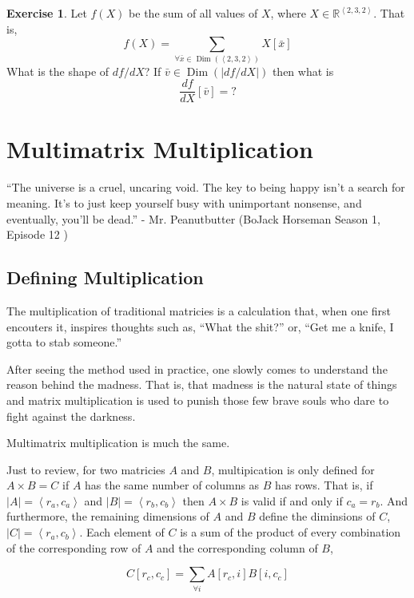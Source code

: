 \documentclass[12pt]{book}
\theoremstyle{plain}
\theoremstyle{definition}
\newtheorem{exercise}{Exercise}[chapter]
\theoremstyle{ppart}
\theoremstyle{case}
\theoremstyle{solution}
\DeclareMathOperator{\Dim}{Dim}
\begin{document}
\begin{exercise}
Let $f(X)$ be the sum of all values of $X$, where
$X \in \mathbb{R}^{\left<2,3,2\right>}$. That is,
\[ f(X) = \sum_{\forall \bar{x} \in \Dim(\left<2,3,2\right>)} X[\bar{x}] \]
What is the shape of $df/dX$? If $\bar{v} \in \Dim(|df/dX|)$ then what is
\[ \frac{df}{dX}[\bar{v}] = ? \]
\end{exercise}

\chapter{Multimatrix Multiplication}

\begin{displayquote}
``The universe is a cruel, uncaring void. The key to being happy isn't a search
for meaning. It's to just keep yourself busy with unimportant nonsense, and eventually,
you'll be dead.'' - Mr. Peanutbutter (BoJack Horseman Season 1, Episode 12
\cite{bojack})
\end{displayquote}

\section{Defining Multiplication}

The multiplication of traditional matricies is a calculation that, when one first
encouters it, inspires thoughts such as, ``What the shit?'' or, ``Get me a knife,
I gotta to stab someone.''

After seeing the method used in practice, one slowly comes to understand the
reason behind the madness. That is, that madness is the natural state of things
and matrix multiplication is used to punish those few brave souls who dare to
fight against the darkness.

Multimatrix multiplication is much the same.

Just to review, for two matricies $A$ and $B$, multipication is only defined
for $A \times B = C$ if $A$ has the same number of columns as $B$ has rows.
That is, if $|A| = \left< r_a, c_a \right>$ and $|B| = \left< r_b, c_b \right>$
then $A \times B$ is valid if and only if $c_a = r_b$. And furthermore,
the remaining dimensions of $A$ and $B$ define the diminsions of $C$,
$|C| = \left< r_a, c_b \right>$. Each element of $C$ is a sum of the product of
every combination of the corresponding row of $A$ and the corresponding column of
$B$,

\[ C[r_c, c_c] = \sum_{\forall i} A[r_c, i] B[i, c_c] \]
\end{document}
